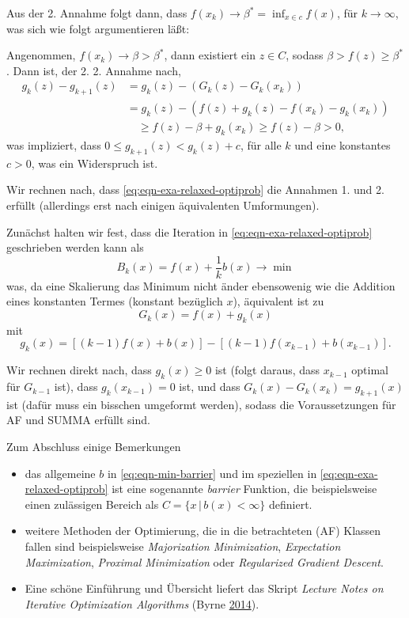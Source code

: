 \documentclass[
]{book}
\providecommand{\tightlist}{%
  \setlength{\itemsep}{0pt}\setlength{\parskip}{0pt}}
\theoremstyle{definition}
\theoremstyle{definition}
\theoremstyle{definition}
\theoremstyle{definition}
\theoremstyle{remark}
\begin{document}
Aus der 2. Annahme folgt dann, dass \(f(x_k) \to \beta^*=\inf_{x\in c}f(x)\), für \(k\to \infty\), was sich wie folgt argumentieren läßt:

Angenommen, \(f(x_k) \to \beta > \beta^*\), dann existiert ein \(z\in C\), sodass \(\beta > f(z) \geq \beta^*\). Dann ist, der 2. 2. Annahme nach,
\begin{equation*}
\begin{split}
g_k(z) - g_{k+1}(z) &= g_k(z) - (G_k(z)-G_k(x_k))    \\
&=g_k(z) - (f(z) + g_k(z) - f(x_k) - g_k(x_k)) \\
&\quad \geq f(z) - \beta + g_k(x_k) \geq f(z) - \beta > 0,
\end{split}
\end{equation*}
was impliziert, dass \(0\leq g_{k+1}(z)<g_k(z)+c\), für alle \(k\) und eine konstantes \(c>0\), was ein Widerspruch ist.

Wir rechnen nach, dass \eqref{eq:eqn-exa-relaxed-optiprob} die Annahmen 1. und 2. erfüllt (allerdings erst nach einigen äquivalenten Umformungen).

Zunächst halten wir fest, dass die Iteration in \eqref{eq:eqn-exa-relaxed-optiprob} geschrieben werden kann als
\begin{equation}
B_k(x) = f(x) + \frac 1k b(x) \to \min
\label{eq:eqn-min-barrier}
\end{equation}
was, da eine Skalierung das Minimum nicht änder ebensowenig wie die Addition eines konstanten Termes (konstant bezüglich \(x\)),
äquivalent ist zu
\begin{equation*}
G_k(x) = f(x) + g_k(x)
\end{equation*}
mit
\begin{equation*}
g_k(x) = [(k-1)f(x) + b(x)] - [(k-1)f(x_{k-1}) + b(x_{k-1})].
\end{equation*}

Wir rechnen direkt nach, dass \(g_k(x)\geq 0\) ist (folgt daraus, dass \(x_{k-1}\) optimal für \(G_{k-1}\) ist), dass \(g_k(x_{k-1})=0\) ist, und dass \(G_k(x)-G_k(x_k)=g_{k+1}(x)\) ist (dafür muss ein bisschen umgeformt werden), sodass die Voraussetzungen für AF und SUMMA erfüllt sind.

Zum Abschluss einige Bemerkungen

\begin{itemize}
\tightlist
\item
  das allgemeine \(b\) in \eqref{eq:eqn-min-barrier} und im speziellen in \eqref{eq:eqn-exa-relaxed-optiprob} ist eine sogenannte \emph{barrier} Funktion, die beispielsweise einen zulässigen Bereich als \(C=\{x\,|\, b(x)< \infty\}\) definiert.
\item
  weitere Methoden der Optimierung, die in die betrachteten (AF) Klassen fallen sind beispielsweise \emph{Majorization Minimization}, \emph{Expectation Maximization}, \emph{Proximal Minimization} oder \emph{Regularized Gradient Descent}.
\item
  Eine schöne Einführung und Übersicht liefert das Skript \emph{Lecture Notes on Iterative Optimization Algorithms} (Byrne \protect\hyperlink{ref-Byr14}{2014}).
\end{itemize}
\end{document}
